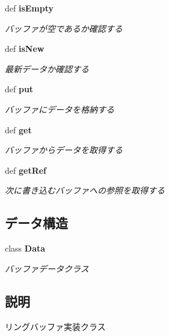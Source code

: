 \begin{CompactItemize}
def {\bf isEmpty}
\begin{CompactList}\small\item\em バッファが空であるか確認する \item\end{CompactList}\item 
def {\bf isNew}
\begin{CompactList}\small\item\em 最新データか確認する \item\end{CompactList}\item 
def {\bf put}
\begin{CompactList}\small\item\em バッファにデータを格納する \item\end{CompactList}\item 
def {\bf get}
\begin{CompactList}\small\item\em バッファからデータを取得する \item\end{CompactList}\item 
def {\bf getRef}
\begin{CompactList}\small\item\em 次に書き込むバッファへの参照を取得する \item\end{CompactList}\end{CompactItemize}
\subsection*{データ構造}
\begin{CompactItemize}
\item 
class {\bf Data}
\begin{CompactList}\small\item\em バッファデータクラス \item\end{CompactList}\end{CompactItemize}


\subsection{説明}
リングバッファ実装クラス 



\footnotesize\begin{verbatim}
\end{verbatim}
\normalsize


